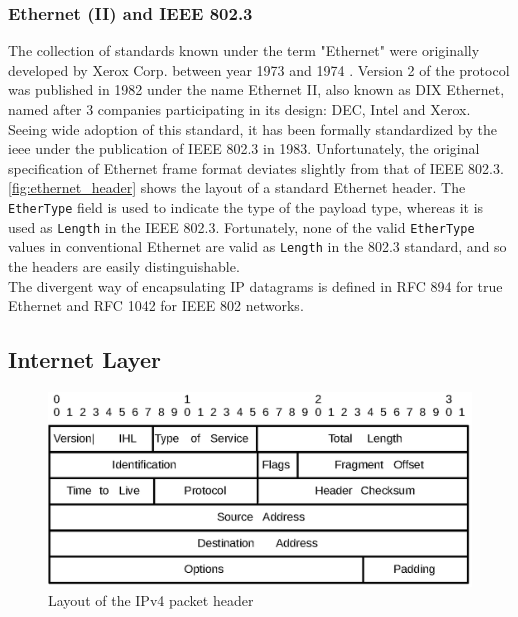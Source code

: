 \subsubsection{Ethernet (II) and IEEE 802.3}
The collection of standards known under the term "Ethernet" were originally
developed by Xerox Corp. between year 1973 and 1974\cite{americanhistory_ethernet}
\cite{tcpip_illustrated_vol1}. Version 2 of the protocol was published in 1982
under the name Ethernet II, also known as DIX Ethernet, named after 3 companies
participating in its design: DEC, Intel and Xerox\cite{heywood2001drew}.\\
Seeing wide adoption of this standard, it has been formally standardized by
the \gls{ieee} under the publication of IEEE 802.3 in
1983\cite{ieee_8023_release}. Unfortunately, the original specification of
Ethernet frame format deviates slightly from that of IEEE
802.3\cite{tcpip_illustrated_vol1}. \autoref{fig:ethernet_header} shows the
layout of a standard Ethernet header. The \texttt{EtherType} field is used to
indicate the type of the payload type, whereas it is used as \texttt{Length} in
the IEEE 802.3. Fortunately, none of the valid \texttt{EtherType} values in
conventional Ethernet are valid as \texttt{Length} in the 802.3 standard, and
so the headers are easily distinguishable.
\\
The divergent way of encapsulating IP datagrams is defined in RFC 894 for
true Ethernet\cite{RFC0894} and RFC 1042 for IEEE 802 networks\cite{RFC1042}.



\subsection{Internet Layer}
\begin{figure}
\includegraphics[width=\linewidth]{background/ip.eps}
\caption{Layout of the IPv4 packet header}
\label{fig:ipv4_header}
\end{figure}

